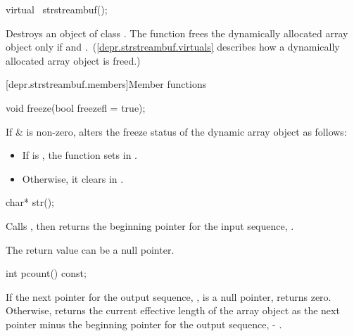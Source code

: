 %
\begin{itemdecl}
virtual ~strstreambuf();
\end{itemdecl}

\begin{itemdescr}
\pnum
\effects
Destroys an object of class
.
The function frees the dynamically allocated array object only if
and
.~(\ref{depr.strstreambuf.virtuals} describes how a dynamically allocated array object is freed.)
\end{itemdescr}

[depr.strstreambuf.members]{Member functions}

%
\begin{itemdecl}
void freeze(bool freezefl = true);
\end{itemdecl}

\begin{itemdescr}
\pnum
\effects
If  \&  is non-zero, alters the
freeze status of the dynamic array object as follows:
\begin{itemize}
\item
If  is
,
the function sets  in .
\item
Otherwise, it clears  in .
\end{itemize}
\end{itemdescr}

%
\begin{itemdecl}
char* str();
\end{itemdecl}

\begin{itemdescr}
\pnum
\effects
Calls
,
then returns the beginning pointer for the input sequence, .

\pnum
\remarks
The return value can be a null pointer.
\end{itemdescr}

%
\begin{itemdecl}
int pcount() const;
\end{itemdecl}

\begin{itemdescr}
\pnum
\effects
If the next pointer for the output sequence, , is
a null pointer, returns zero.
Otherwise, returns the current
effective length of the array object as the next pointer minus the beginning
pointer for the output sequence,  - .
\end{itemdescr}

